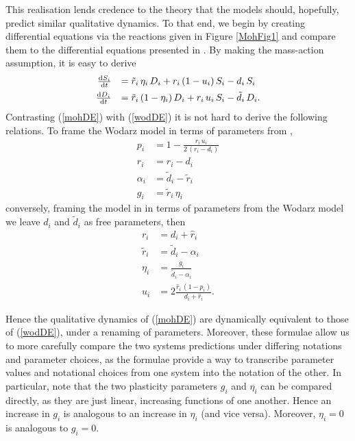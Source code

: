 \documentclass[12pt]{article}
\renewcommand{\d}{{\rm d}}
\begin{document}
This realisation lends credence to the theory that the models should, hopefully, predict similar qualitative dynamics. To that end, we begin by creating differential equations via the reactions given in Figure \ref{MohFig1} and compare them to the differential equations presented in \cite{wodarz}. By making the mass-action assumption, it is easy to derive
\begin{equation}
\begin{array}{rl}
\frac{\d S_i}{\d t}&=\tilde{r}_i\,\eta_i\,D_i+r_i\,(1-u_i)\,S_i-d_i\,S_i\vspace*{5pt}\\
\frac{\d D_i}{\d t}&=\tilde{r}_i\,(1-\eta_i)\,D_i+r_i\,u_i\,S_i-\tilde{d}_i\,D_i.
\end{array}\label{mohDE}
\end{equation}
Contrasting (\ref{mohDE}) with (\ref{wodDE}) it is not hard to derive the following relations. To frame the Wodarz model \cite{wodarz} in terms of parameters from \cite{mohammad},
\begin{align*}
p_i&=1-\frac{r_i\,u_i}{2\,(r_i-d_i)}\\
\hat{r}_i&=r_i-d_i\\
\alpha_i&=\tilde{d}_i-\tilde{r}_i\\
g_i&=\tilde{r}_i\,\eta_i
\end{align*}
conversely, framing the model in \cite{mohammad} in terms of parameters from the Wodarz model \cite{wodarz} we leave $d_i$ and $\tilde{d}_i$ as free parameters, then
\begin{align*}
r_i&=d_i+\hat{r}_i\\
\tilde{r}_i&=\tilde{d}_i-\alpha_i\\
\eta_i&=\frac{g_i}{\tilde{d}_i-\alpha_i}\\
u_i&=2\frac{\hat{r}_i\,(1-p_i)}{d_i+\hat{r}_i}.
\end{align*}

Hence the qualitative dynamics of (\ref{mohDE}) are dynamically equivalent to those of (\ref{wodDE}), under a renaming of parameters. Moreover, these formulae allow us to more carefully compare the two systems predictions under differing notations and parameter choices, as the formulae provide a way to transcribe parameter values and notational choices from one system into the notation of the other. In particular, note that the two plasticity parameters $g_i$ and $\eta_i$ can be compared directly, as they are just linear, increasing functions of one another. Hence an increase in $g_i$ is analogous to an increase in $\eta_i$ (and vice versa). Moreover, $\eta_i=0$ is analogous to $g_i=0$.
\end{document}
